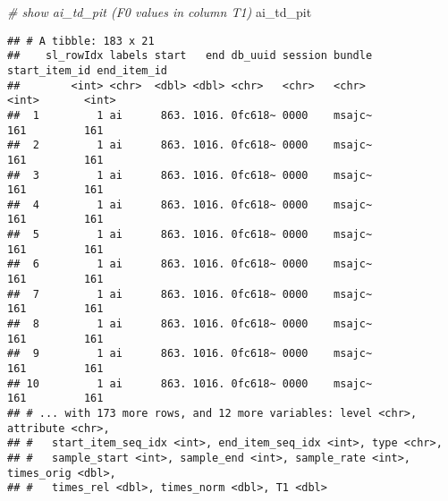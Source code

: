 \documentclass[
]{book}
\newenvironment{Shaded}{\begin{snugshade}}{\end{snugshade}}
\newcommand{\CommentTok}[1]{\textcolor[rgb]{0.56,0.35,0.01}{\textit{#1}}}
\newcommand{\NormalTok}[1]{#1}
\begin{document}
\begin{Shaded}
\begin{Highlighting}[]
\CommentTok{\# show ai\_td\_pit (F0 values in column T1)}
\NormalTok{ai\_td\_pit}
\end{Highlighting}
\end{Shaded}

\begin{verbatim}
## # A tibble: 183 x 21
##    sl_rowIdx labels start   end db_uuid session bundle start_item_id end_item_id
##        <int> <chr>  <dbl> <dbl> <chr>   <chr>   <chr>          <int>       <int>
##  1         1 ai      863. 1016. 0fc618~ 0000    msajc~           161         161
##  2         1 ai      863. 1016. 0fc618~ 0000    msajc~           161         161
##  3         1 ai      863. 1016. 0fc618~ 0000    msajc~           161         161
##  4         1 ai      863. 1016. 0fc618~ 0000    msajc~           161         161
##  5         1 ai      863. 1016. 0fc618~ 0000    msajc~           161         161
##  6         1 ai      863. 1016. 0fc618~ 0000    msajc~           161         161
##  7         1 ai      863. 1016. 0fc618~ 0000    msajc~           161         161
##  8         1 ai      863. 1016. 0fc618~ 0000    msajc~           161         161
##  9         1 ai      863. 1016. 0fc618~ 0000    msajc~           161         161
## 10         1 ai      863. 1016. 0fc618~ 0000    msajc~           161         161
## # ... with 173 more rows, and 12 more variables: level <chr>, attribute <chr>,
## #   start_item_seq_idx <int>, end_item_seq_idx <int>, type <chr>,
## #   sample_start <int>, sample_end <int>, sample_rate <int>, times_orig <dbl>,
## #   times_rel <dbl>, times_norm <dbl>, T1 <dbl>
\end{verbatim}
\end{document}
